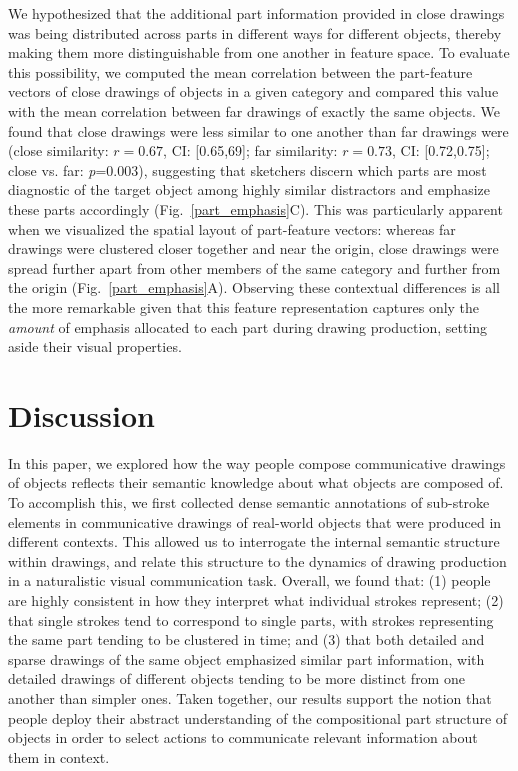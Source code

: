 \documentclass[10pt,letterpaper]{article}
\begin{document}
We hypothesized that the additional part information provided in close drawings was being distributed across parts in different ways for different objects, thereby making them more distinguishable from one another in feature space.
To evaluate this possibility, we computed the mean correlation between the part-feature vectors of close drawings of objects in a given category and compared this value with the mean correlation between far drawings of exactly the same objects. 
We found that close drawings were less similar to one another than far drawings were (close similarity: $r = 0.67$, CI: [0.65,69]; far similarity: $r = 0.73$, CI: [0.72,0.75]; close vs. far: \textit{p}=$0.003$), suggesting that sketchers discern which parts are most diagnostic of the target object among highly similar distractors and emphasize these parts accordingly (Fig.~\ref{part_emphasis}C).
This was particularly apparent when we visualized the spatial layout of part-feature vectors: whereas far drawings were clustered closer together and near the origin, close drawings were spread further apart from other members of the same category and further from the origin (Fig.~\ref{part_emphasis}A).
Observing these contextual differences is all the more remarkable given that this feature representation captures only the \textit{amount} of emphasis allocated to each part during drawing production, setting aside their visual properties. 

\section{Discussion}

In this paper, we explored how the way people compose communicative drawings of objects reflects their semantic knowledge about what objects are composed of. 
To accomplish this, we first collected dense semantic annotations of sub-stroke elements in communicative drawings of real-world objects that were produced in different contexts. 
This allowed us to interrogate the internal semantic structure within drawings, and relate this structure to the dynamics of drawing production in a naturalistic visual communication task.
Overall, we found that: (1) people are highly consistent in how they interpret what individual strokes represent; (2) that single strokes tend to correspond to single parts, with strokes representing the same part tending to be clustered in time; and (3) that both detailed and sparse drawings of the same object emphasized similar part information, with detailed drawings of different objects tending to be more distinct from one another than simpler ones. 
Taken together, our results support the notion that people deploy their abstract understanding of the compositional part structure of objects in order to select actions to communicate relevant information about them in context.  
\end{document}
